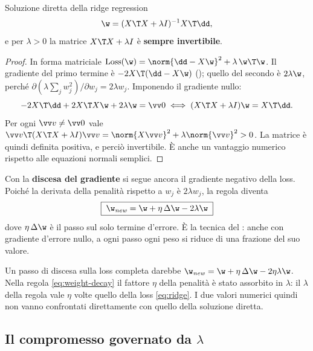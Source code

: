 \begin{proprieta}{Soluzione diretta della ridge regression}
\[
\w = (X\T X + \lambda I)^{-1}X\T\dd ,
\]
e per $\lambda>0$ la matrice $X\T X+\lambda I$ è \textbf{sempre invertibile}.
\end{proprieta}
\begin{proof}
In forma matriciale $\mathrm{Loss}(\w) = \norm{\dd - X\w}^2 + \lambda\,\w\T\w$. Il gradiente del primo termine è
$-2X\T(\dd-X\w)$ (); quello del secondo è $2\lambda\w$, perché
$\partial(\lambda\sum_jw_j^2)/\partial w_j = 2\lambda w_j$. Imponendo il gradiente nullo:
\[
-2X\T\dd + 2X\T X\w + 2\lambda\w = \vv0 \iff (X\T X + \lambda I)\w = X\T\dd .
\]
Per ogni $\vv v\neq\vv0$ vale $\vv v\T(X\T X+\lambda I)\vv v = \norm{X\vv v}^2 + \lambda\norm{\vv v}^2 > 0$. La
matrice è quindi definita positiva, e perciò invertibile. È anche un vantaggio numerico rispetto alle equazioni normali
semplici.
\end{proof}

Con la \textbf{discesa del gradiente} si segue ancora il gradiente negativo della loss. Poiché la derivata della
penalità rispetto a $w_j$ è $2\lambda w_j$, la regola diventa
\begin{equation}\label{eq:weight-decay}
\boxed{\;\w_{\mathit{new}} = \w + \eta\,\Delta\w - 2\lambda\w\;}
\end{equation}
dove $\eta\,\Delta\w$ è il passo sul solo termine d'errore. È la tecnica del : anche con
gradiente d'errore nullo, a ogni passo ogni peso si riduce di una frazione del suo valore.

\begin{attenzione}
Un passo di discesa sulla loss completa darebbe $\w_{\mathit{new}} = \w + \eta\,\Delta\w - 2\eta\lambda\w$. Nella
regola \eqref{eq:weight-decay} il fattore $\eta$ della penalità è stato assorbito in $\lambda$: il $\lambda$ della
regola vale $\eta$ volte quello della loss \eqref{eq:ridge}. I due valori numerici quindi non vanno confrontati
direttamente con quello della soluzione diretta.
\end{attenzione}

\subsection{Il compromesso governato da $\lambda$}

